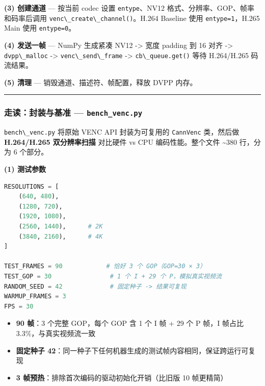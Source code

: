 \textbf{(3) 创建通道} --- 按当前 codec 设置
\passthrough{\lstinline!entype!}、NV12
格式、分辨率、GOP、帧率和码率后调用
\passthrough{\lstinline!venc\_create\_channel()!}。H.264 Baseline 使用
\passthrough{\lstinline!entype=1!}，H.265 Main 使用
\passthrough{\lstinline!entype=0!}。

\textbf{(4) 发送一帧} --- NumPy 生成紧凑 NV12 -\textgreater{} 宽度
padding 到 16 对齐 -\textgreater{}
\passthrough{\lstinline!dvpp\_malloc!} -\textgreater{}
\passthrough{\lstinline!venc\_send\_frame!} -\textgreater{}
\passthrough{\lstinline!cb\_queue.get()!} 等待 H.264/H.265 码流结果。

\textbf{(5) 清理} --- 销毁通道、描述符、帧配置，释放 DVPP 内存。

\begin{center}\rule{0.5\linewidth}{0.5pt}\end{center}

\subsubsection{\texorpdfstring{走读：封装与基准 ---
\texttt{bench\_venc.py}}{走读：封装与基准 --- bench\_venc.py}}\label{src-book-chapter6-h37}

\passthrough{\lstinline!bench\_venc.py!} 将原始 VENC API 封装为可复用的
\passthrough{\lstinline!CannVenc!} 类，然后做 \textbf{H.264/H.265
双分辨率扫描} 对比硬件 vs CPU 编码性能。整个文件 \textasciitilde380
行，分为 6 个部分。

\textbf{(1) 测试参数}

\begin{lstlisting}[language=Python]
RESOLUTIONS = [
    (640, 480),
    (1280, 720),
    (1920, 1080),
    (2560, 1440),      # 2K
    (3840, 2160),      # 4K
]

TEST_FRAMES = 90            # 恰好 3 个 GOP（GOP=30 × 3）
TEST_GOP = 30                # 1 个 I + 29 个 P，模拟真实视频流
RANDOM_SEED = 42             # 固定种子 -> 结果可复现
WARMUP_FRAMES = 3
FPS = 30
\end{lstlisting}

\begin{itemize}
\tightlist
\item
  \textbf{90 帧}：3 个完整 GOP，每个 GOP 含 1 个 I 帧 + 29 个 P 帧，I
  帧占比 3.3\%，与真实视频流一致
\item
  \textbf{固定种子
  42}：同一种子下任何机器生成的测试帧内容相同，保证跨运行可复现
\item
  \textbf{3 帧预热}：排除首次编码的驱动初始化开销（比旧版 10 帧更精简）
\end{itemize}

